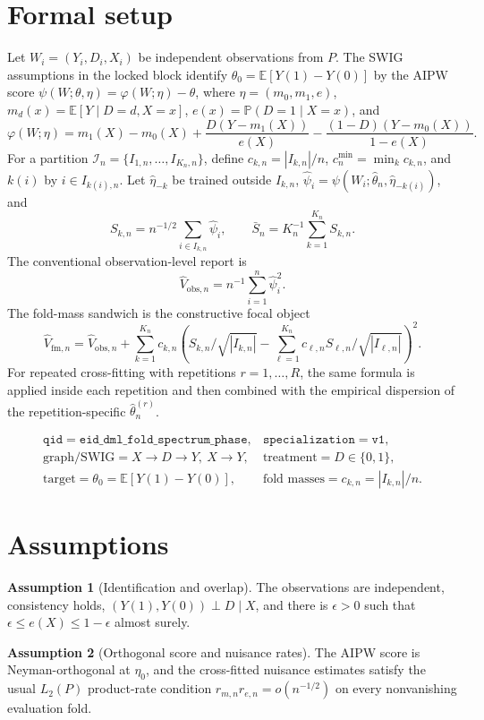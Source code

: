\documentclass[11pt]{article}
\newcommand{\E}{\mathbb{E}}
\renewcommand{\Pr}{\mathbb{P}}
\theoremstyle{definition}
\newtheorem{assumption}{Assumption}
\theoremstyle{plain}
\theoremstyle{remark}
\begin{document}
\section{Formal setup}
Let \(W_i=(Y_i,D_i,X_i)\) be independent observations from \(P\). The SWIG assumptions in the locked block identify \(\theta_0=\E[Y(1)-Y(0)]\) by the AIPW score \(\psi(W;\theta,\eta)=\varphi(W;\eta)-\theta\), where \(\eta=(m_0,m_1,e)\), \(m_d(x)=\E[Y\mid D=d,X=x]\), \(e(x)=\Pr(D=1\mid X=x)\), and
\[
\varphi(W;\eta)=m_1(X)-m_0(X)+\frac{D(Y-m_1(X))}{e(X)}-\frac{(1-D)(Y-m_0(X))}{1-e(X)}.
\]
For a partition \(\mathcal I_n=\{I_{1,n},\ldots,I_{K_n,n}\}\), define \(c_{k,n}=|I_{k,n}|/n\), \(c_n^{\min}=\min_k c_{k,n}\), and \(k(i)\) by \(i\in I_{k(i),n}\). Let \(\hat\eta_{-k}\) be trained outside \(I_{k,n}\), \(\hat\psi_i=\psi(W_i;\hat\theta_n,\hat\eta_{-k(i)})\), and
\[
S_{k,n}=n^{-1/2}\sum_{i\in I_{k,n}}\hat\psi_i,\qquad
\bar S_n=K_n^{-1}\sum_{k=1}^{K_n}S_{k,n}.
\]
The conventional observation-level report is
\[
\hat V_{\mathrm{obs},n}=n^{-1}\sum_{i=1}^n \hat\psi_i^2.
\]
The fold-mass sandwich is the constructive focal object
\[
\hat V_{\mathrm{fm},n}=\hat V_{\mathrm{obs},n}+
\sum_{k=1}^{K_n} c_{k,n}\left(S_{k,n}/\sqrt{|I_{k,n}|}-\sum_{\ell=1}^{K_n}c_{\ell,n}S_{\ell,n}/\sqrt{|I_{\ell,n}|}\right)^2.
\]
For repeated cross-fitting with repetitions \(r=1,\ldots,R\), the same formula is applied inside each repetition and then combined with the empirical dispersion of the repetition-specific \(\hat\theta_n^{(r)}\).

\[
\begin{array}{ll}
\texttt{qid}=\texttt{eid\_dml\_fold\_spectrum\_phase},&
\texttt{specialization}=\texttt{v1},\\
\text{graph/SWIG}=X\to D\to Y,\ X\to Y,&
\text{treatment}=D\in\{0,1\},\\
\text{target}=\theta_0=\E[Y(1)-Y(0)],&
\text{fold masses}=c_{k,n}=|I_{k,n}|/n.
\end{array}
\]

\section{Assumptions}
\begin{assumption}[Identification and overlap]\label{ass:id}
The observations are independent, consistency holds, \((Y(1),Y(0))\perp D\mid X\), and there is \(\epsilon>0\) such that \(\epsilon\le e(X)\le 1-\epsilon\) almost surely.
\end{assumption}

\begin{assumption}[Orthogonal score and nuisance rates]\label{ass:orth}
The AIPW score is Neyman-orthogonal at \(\eta_0\), and the cross-fitted nuisance estimates satisfy the usual \(L_2(P)\) product-rate condition \(r_{m,n}r_{e,n}=o(n^{-1/2})\) on every nonvanishing evaluation fold.
\end{assumption}
\end{document}
